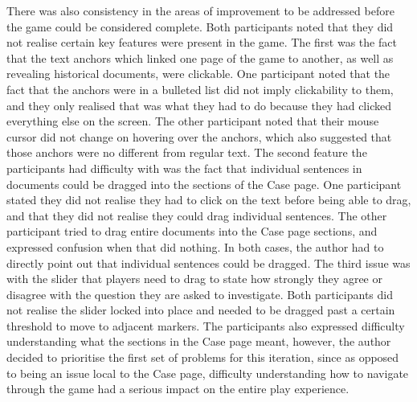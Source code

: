 \documentclass{l4proj}
\begin{document}
There was also consistency in the areas of improvement to be addressed before the game could be considered complete. Both participants noted that they did not realise certain key features were present in the game. The first was the fact that the text anchors which linked one page of the game to another, as well as revealing historical documents, were clickable. One participant noted that the fact that the anchors were in a bulleted list did not imply clickability to them, and they only realised that was what they had to do because they had clicked everything else on the screen. The other participant noted that their mouse cursor did not change on hovering over the anchors, which also suggested that those anchors were no different from regular text. The second feature the participants had difficulty with was the fact that individual sentences in documents could be dragged into the sections of the Case page. One participant stated they did not realise they had to click on the text before being able to drag, and that they did not realise they could drag individual sentences. The other participant tried to drag entire documents into the Case page sections, and expressed confusion when that did nothing. In both cases, the author had to directly point out that individual sentences could be dragged. The third issue was with the slider that players need to drag to state how strongly they agree or disagree with the question they are asked to investigate. Both participants did not realise the slider locked into place and needed to be dragged past a certain threshold to move to adjacent markers. The participants also expressed difficulty understanding what the sections in the Case page meant, however, the author decided to prioritise the first set of problems for this iteration, since as opposed to being an issue local to the Case page, difficulty understanding how to navigate through the game had a serious impact on the entire play experience. 
\end{document}
